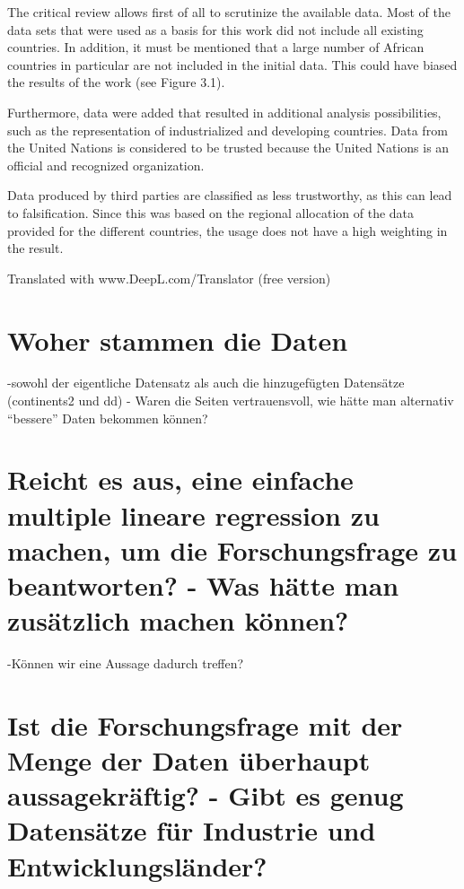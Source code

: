 \documentclass[
  11pt,
  a4paper,
  twoside]{scrbook}
\begin{document}
The critical review allows first of all to scrutinize the available data. Most of the data sets that were used as a basis for this work did not include all existing countries. In addition, it must be mentioned that a large number of African countries in particular are not included in the initial data. This could have biased the results of the work (see Figure 3.1).

Furthermore, data were added that resulted in additional analysis possibilities, such as the representation of industrialized and developing countries. Data from the United Nations is considered to be trusted because the United Nations is an official and recognized organization.

Data produced by third parties are classified as less trustworthy, as this can lead to falsification. Since this was based on the regional allocation of the data provided for the different countries, the usage does not have a high weighting in the result.

Translated with www.DeepL.com/Translator (free version)

\hypertarget{woher-stammen-die-daten}{%
\section{Woher stammen die Daten}\label{woher-stammen-die-daten}}

-sowohl der eigentliche Datensatz als auch die hinzugefügten Datensätze (continents2 und dd) - Waren die Seiten vertrauensvoll, wie hätte man alternativ ``bessere'' Daten bekommen können?

\hypertarget{reicht-es-aus-eine-einfache-multiple-lineare-regression-zu-machen-um-die-forschungsfrage-zu-beantworten---was-huxe4tte-man-zusuxe4tzlich-machen-kuxf6nnen}{%
\section{Reicht es aus, eine einfache multiple lineare regression zu machen, um die Forschungsfrage zu beantworten? - Was hätte man zusätzlich machen können?}\label{reicht-es-aus-eine-einfache-multiple-lineare-regression-zu-machen-um-die-forschungsfrage-zu-beantworten---was-huxe4tte-man-zusuxe4tzlich-machen-kuxf6nnen}}

-Können wir eine Aussage dadurch treffen?

\hypertarget{ist-die-forschungsfrage-mit-der-menge-der-daten-uxfcberhaupt-aussagekruxe4ftig---gibt-es-genug-datensuxe4tze-fuxfcr-industrie-und-entwicklungsluxe4nder}{%
\section{Ist die Forschungsfrage mit der Menge der Daten überhaupt aussagekräftig? - Gibt es genug Datensätze für Industrie und Entwicklungsländer?}\label{ist-die-forschungsfrage-mit-der-menge-der-daten-uxfcberhaupt-aussagekruxe4ftig---gibt-es-genug-datensuxe4tze-fuxfcr-industrie-und-entwicklungsluxe4nder}}
\end{document}
